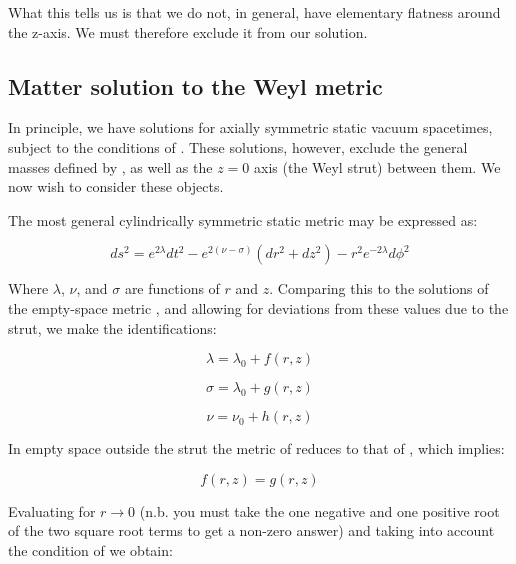 \documentclass{article}
\begin{document}
What this tells us is that we do not, in general, have elementary flatness around the z-axis. We must therefore exclude it from our solution.

\subsection{Matter solution to the Weyl metric}
\label{subsec:matter-solution}

In principle, we have solutions for axially symmetric static vacuum spacetimes, subject to the conditions of . These solutions, however, exclude the general masses defined by , as well as the $z=0$ axis (the Weyl strut) between them. We now wish to consider these objects. 

The most general cylindrically symmetric static metric may be expressed as:

\begin{equation}
ds^{2}=e^{2\lambda}dt^{2}-e^{2\left(\nu-\sigma\right)}\left(dr^{2}+dz^{2}\right)-r^{2}e^{-2\lambda}d\phi^{2}
\label{eq:weyl-metric}
\end{equation}

Where $\lambda$, $\nu$, and $\sigma$ are functions of $r$ and $z$. Comparing this to the solutions of the empty-space metric , and allowing for deviations from these values due to the strut, we make the identifications:

\begin{equation}
	\label{eq:lambda-matter}
	\lambda=\lambda_0 + f(r,z)
\end{equation}

\begin{equation}
	\label{eq:sigma-matter}
	\sigma=\lambda_0 + g(r,z)
\end{equation}

\begin{equation}
	\label{eq:nu-matter}
	\nu=\nu_0 + h(r,z)
\end{equation}

In empty space outside the strut the metric of  reduces to that of  , which implies:

\begin{equation}
	\label{eq:f=g}
	f(r,z)=g(r,z)
\end{equation}

Evaluating  for $r\rightarrow 0$ (n.b. you must take the one negative and one positive root of the two square root terms to get a non-zero answer) and taking into account the condition of  we obtain:
\end{document}
